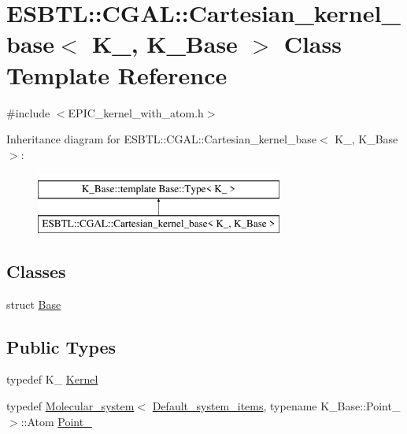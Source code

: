 \hypertarget{classESBTL_1_1CGAL_1_1Cartesian__kernel__base}{}\section{E\+S\+B\+TL\+:\+:C\+G\+AL\+:\+:Cartesian\+\_\+kernel\+\_\+base$<$ K\+\_\+, K\+\_\+\+Base $>$ Class Template Reference}
\label{classESBTL_1_1CGAL_1_1Cartesian__kernel__base}


{\ttfamily \#include $<$E\+P\+I\+C\+\_\+kernel\+\_\+with\+\_\+atom.\+h$>$}

Inheritance diagram for E\+S\+B\+TL\+:\+:C\+G\+AL\+:\+:Cartesian\+\_\+kernel\+\_\+base$<$ K\+\_\+, K\+\_\+\+Base $>$\+:\begin{figure}[H]
\begin{center}
\leavevmode
\includegraphics[height=2.000000cm]{classESBTL_1_1CGAL_1_1Cartesian__kernel__base}
\end{center}
\end{figure}
\subsection*{Classes}
\begin{DoxyCompactItemize}
\item 
struct \hyperlink{structESBTL_1_1CGAL_1_1Cartesian__kernel__base_1_1Base}{Base}
\end{DoxyCompactItemize}
\subsection*{Public Types}
\begin{DoxyCompactItemize}
\item 
typedef K\+\_\+ \hyperlink{classESBTL_1_1CGAL_1_1Cartesian__kernel__base_a281013f75db02ed3c77c1247776c4a00}{Kernel}
\item 
typedef \hyperlink{classESBTL_1_1Molecular__system}{Molecular\+\_\+system}$<$ \hyperlink{structESBTL_1_1Default__system__items}{Default\+\_\+system\+\_\+items}, typename K\+\_\+\+Base\+::\+Point\+\_ $>$\+::Atom \hyperlink{classESBTL_1_1CGAL_1_1Cartesian__kernel__base_a9a2ac39990666886a8bc8254b608fdac}{Point\+\_}
\end{DoxyCompactItemize}


